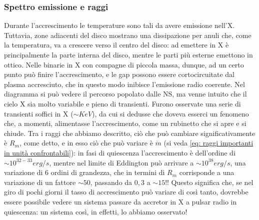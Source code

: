 \subsubsection{Spettro emissione e raggi}
Durante l'accrescimento le temperature sono tali da avere emissione nell'X. Tuttavia, zone adiacenti del disco mostrano una dissipazione per anuli che, come la temperatura, va a crescere verso il centro del disco:
ad emettere in X è principalmente la parte interna del disco, mentre le parti più esterne emettono in ottico.
Nelle binarie in X con compagne di piccola massa, dunque, ad un certo punto può finire l'accrescimento, e le gap possono essere cortocircuitate dal plasma accresciuto, che in questo modo inibisce l'emissione radio coerente.
Nel diagramma si può vedere il percorso popolato dalle NS, ma venne intuito che il cielo X sia molto variabile e pieno di transienti.
Furono osservate una serie di transienti soffici in X ($\sim KeV$), da cui si dedusse che doveva esserci un fenomeno che, a momenti, alimentasse l'accrescimento, come un rubinetto che si apre e si chiude.
Tra i raggi che abbiamo descritto, ciò che può cambiare significativamente è $R_m$, come detto, e in esso ciò che può variare è $\dot{m}$ (si veda \eqref{eq: raggi importanti in unità confrontabili}):
in fasi di quiescenza l'accrescimento è dell'ordine di $\sim10^{32-33}erg/s $, mentre nel limite di Eddington può arrivare a $\sim10^{38}erg/s $, una variazione di $6$ ordini di grandezza, che in termini di $R_m$ corrisponde a una variazione di un fattore $\sim50$, passando da $0,3$ a $\sim 15$!!
Questo significa che, se nel giro di pochi giorni il tasso di accrescimento può variare di così tanto, dovrebbe essere possibile vedere un sistema passare da accretor in X a pulsar radio in quiescenza: un sistema così, in effetti, lo abbiamo osservato!

